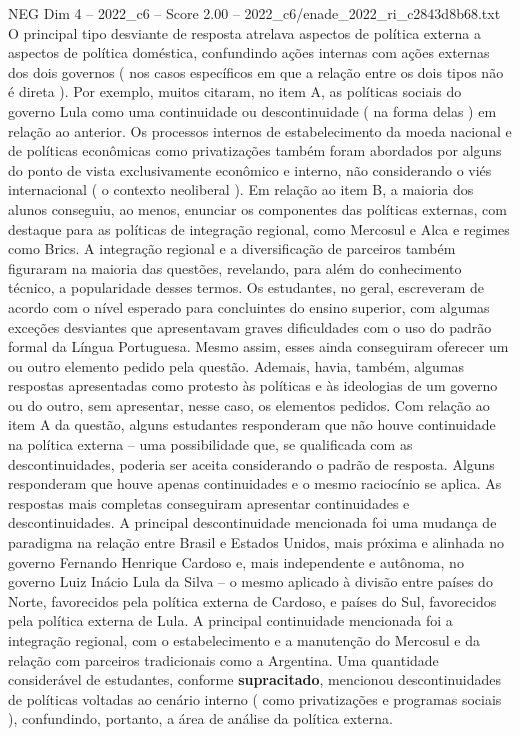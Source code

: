 \begin{textsample}{NEG Dim 4 – 2022\_c6 – Score 2.00 – 2022\_c6/enade\_2022\_ri\_c2843d8b68.txt}
O principal tipo desviante de resposta atrelava aspectos de política externa a aspectos de política doméstica, confundindo ações internas com ações externas dos dois governos ( nos casos específicos em que a relação entre os dois tipos não é direta ).
Por exemplo, muitos citaram, no item A, as políticas sociais do governo Lula como uma continuidade ou descontinuidade ( na forma delas ) em relação ao anterior.
Os processos internos de estabelecimento da moeda nacional e de políticas econômicas como privatizações também foram abordados por alguns do ponto de vista exclusivamente econômico e interno, não considerando o viés internacional ( o contexto neoliberal ).
Em relação ao item B, a maioria dos alunos conseguiu, ao menos, enunciar os componentes das políticas externas, com destaque para as políticas de integração regional, como Mercosul e Alca e regimes como Brics.
A integração regional e a diversificação de parceiros também figuraram na maioria das questões, revelando, para além do conhecimento técnico, a popularidade desses termos.
Os estudantes, no geral, escreveram de acordo com o nível esperado para concluintes do ensino superior, com algumas exceções desviantes que apresentavam graves dificuldades com o uso do padrão formal da Língua Portuguesa.
Mesmo assim, esses ainda conseguiram oferecer um ou outro elemento pedido pela questão.
Ademais, havia, também, algumas respostas apresentadas como protesto às políticas e às ideologias de um governo ou do outro, sem apresentar, nesse caso, os elementos pedidos.
Com relação ao item A da questão, alguns estudantes responderam que não houve continuidade na política externa – uma possibilidade que, se qualificada com as descontinuidades, poderia ser aceita considerando o padrão de resposta.
Alguns responderam que houve apenas continuidades e o mesmo raciocínio se aplica.
As respostas mais completas conseguiram apresentar continuidades e descontinuidades.
A principal descontinuidade mencionada foi uma mudança de paradigma na relação entre Brasil e Estados Unidos, mais próxima e alinhada no governo Fernando Henrique Cardoso e, mais independente e autônoma, no governo Luiz Inácio Lula da Silva – o mesmo aplicado à divisão entre países do Norte, favorecidos pela política externa de Cardoso, e países do Sul, favorecidos pela política externa de Lula.
A principal continuidade mencionada foi a integração regional, com o estabelecimento e a manutenção do Mercosul e da relação com parceiros tradicionais como a Argentina.
Uma quantidade considerável de estudantes, conforme \textbf{supracitado}, mencionou descontinuidades de políticas voltadas ao cenário interno ( como privatizações e programas sociais ), confundindo, portanto, a área de análise da política externa.

\end{textsample}
